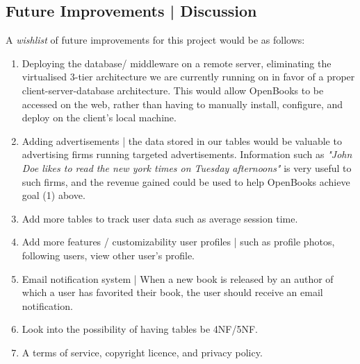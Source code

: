 \documentclass[letter, 12pt, titlepage]{article}
\begin{document}
	\subsection{Future Improvements | Discussion}
		A \textit{wishlist} of future improvements for this project would be as follows:
		\begin{enumerate}
			\item Deploying the database/ middleware on a remote server, eliminating the virtualised 3-tier architecture we are currently running on in favor of a proper client-server-database architecture. This would allow OpenBooks to be accessed on the web, rather than having to manually install, configure, and deploy on the client's local machine.
			\item Adding advertisements | the data stored in our tables would be valuable to advertising firms running targeted advertisements. Information such as \textit{"John Doe likes to read the new york times on Tuesday afternoons"} is very useful to such firms, and the revenue gained could be used to help OpenBooks achieve  goal (1) above.
			\item Add more tables to track user data such as average session time.
			\item Add more features / customizability user profiles |  such as profile photos, following users, view other user's profile.
			\item Email notification system | When a new book is released by an author of which a user has favorited their book, the user should receive an email notification.
			\item Look into the possibility of having tables be 4NF/5NF.
			\item A terms of service, copyright licence, and privacy policy.
		\end{enumerate}
\end{document}
